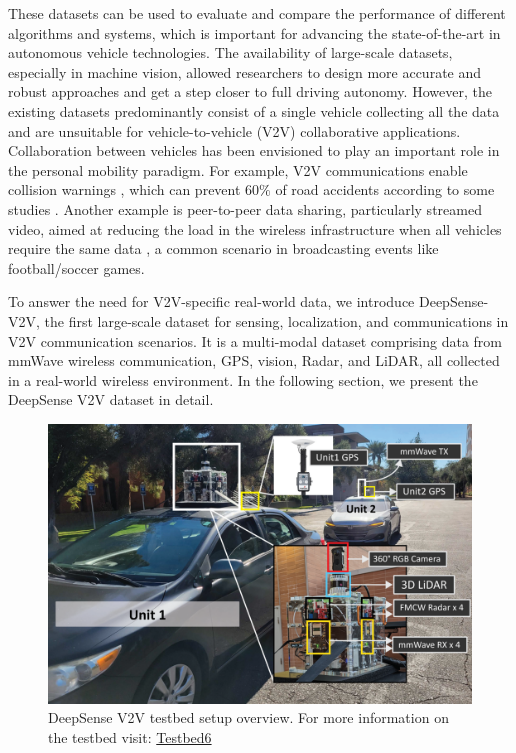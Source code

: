 \documentclass[10pt,comsoc]{IEEEtran}
\begin{document}
These datasets can be used to evaluate and compare the performance of different algorithms and systems, which is important for advancing the state-of-the-art in autonomous vehicle technologies. The availability of large-scale datasets, especially in machine vision, allowed researchers to design more accurate and robust approaches and get a step closer to full driving autonomy. However, the existing datasets predominantly consist of a single vehicle collecting all the data and are unsuitable for vehicle-to-vehicle (V2V) collaborative applications. Collaboration between vehicles has been envisioned to play an important role in the personal mobility paradigm. For example, V2V communications enable collision warnings \cite{collision_warning_v2v}, which can prevent $60\%$ of road accidents according to some studies \cite{collision_avoidance_60_percent}. Another example is peer-to-peer data sharing, particularly streamed video, aimed at reducing the load in the wireless infrastructure when all vehicles require the same data \cite{p2p_video_streaming}, a common scenario in broadcasting events like football/soccer games.

To answer the need for V2V-specific real-world data, we introduce DeepSense-V2V, the first large-scale dataset for sensing, localization, and communications in V2V communication scenarios. It is a multi-modal dataset comprising data from mmWave wireless communication, GPS, vision, Radar, and LiDAR, all collected in a real-world wireless environment. In the following section, we present the DeepSense V2V dataset in detail. 

\begin{figure}[t]
	\centering
	\includegraphics[width=1\columnwidth]{DeepSense_V2V_testbed_small}
	\caption{DeepSense V2V testbed setup overview. For more information on the testbed visit: \href{https://www.deepsense6g.net/data-collection/}{Testbed6}}
	\label{fig:V2V_testbed}
\end{figure}
\end{document}
